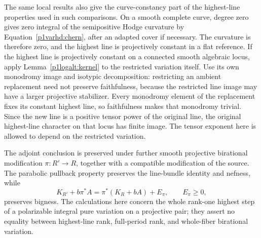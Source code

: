 \begin{remark}
\label{p4int:restricted-tensor}
The same local results also give the curve-constancy part
of the highest-line properties used in such comparisons.  On a smooth
complete curve, degree zero gives zero integral of the semipositive
Hodge curvature by Equation~\eqref{p1varhd:chern}, after an adapted
cover if necessary.  The curvature is therefore zero, and the highest
line is projectively constant in a flat reference.  If the highest line
is projectively constant on a connected smooth algebraic locus, apply
Lemma~\ref{p1logalt:kernel} to the restricted variation itself.
Use its own monodromy image and isotypic decomposition: restricting
an ambient replacement need not preserve faithfulness, because the
restricted line image may have a larger projective stabilizer.
Every monodromy element of the replacement fixes its constant highest
line, so faithfulness makes that monodromy trivial.  Since the new line
is a positive tensor power of the original line, the original
highest-line character on that locus has finite image.  The tensor
exponent here is allowed to depend on the restricted variation.
\end{remark}

\begin{remark}\label{p1varhd:further-models}
The adjoint conclusion is preserved under further smooth projective
birational modification $\pi:R'\to R$, together with a compatible
modification of the source.  The parabolic pullback property preserves
the line-bundle identity and nefness, while
\[
 K_{R'}+b\pi^*A
   =\pi^*(K_R+bA)+E_\pi,\qquad E_\pi\geq0,
\]
preserves bigness.  The calculations here concern the whole rank-one
highest step of a polarizable integral pure variation on a projective
pair; they assert no equality between highest-line rank, full-period
rank, and whole-fiber birational variation.
\end{remark}

